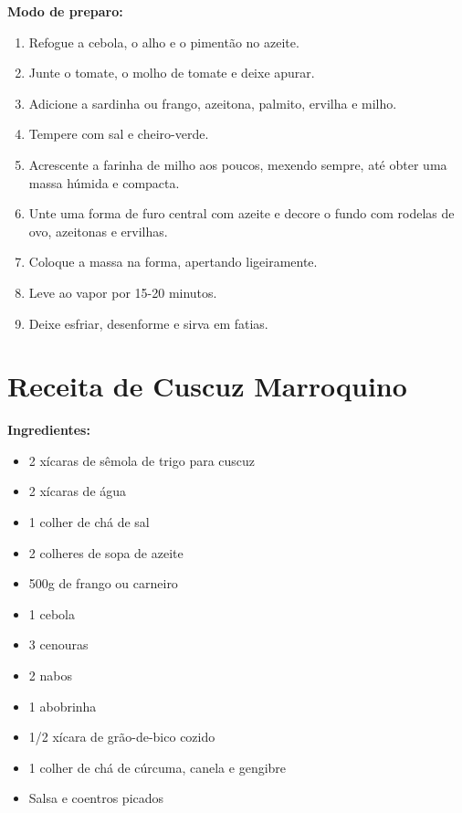 \documentclass[12pt,a4paper,openright]{book}
\begin{document}
\textbf{Modo de preparo:}
\begin{enumerate}
    \item Refogue a cebola, o alho e o pimentão no azeite.
    \item Junte o tomate, o molho de tomate e deixe apurar.
    \item Adicione a sardinha ou frango, azeitona, palmito, ervilha e milho.
    \item Tempere com sal e cheiro-verde.
    \item Acrescente a farinha de milho aos poucos, mexendo sempre, até obter uma massa húmida e compacta.
    \item Unte uma forma de furo central com azeite e decore o fundo com rodelas de ovo, azeitonas e ervilhas.
    \item Coloque a massa na forma, apertando ligeiramente.
    \item Leve ao vapor por 15-20 minutos.
    \item Deixe esfriar, desenforme e sirva em fatias.
\end{enumerate}

\section{Receita de Cuscuz Marroquino}

\textbf{Ingredientes:}
\begin{itemize}
    \item 2 xícaras de sêmola de trigo para cuscuz
    \item 2 xícaras de água
    \item 1 colher de chá de sal
    \item 2 colheres de sopa de azeite
    \item 500g de frango ou carneiro
    \item 1 cebola
    \item 3 cenouras
    \item 2 nabos
    \item 1 abobrinha
    \item 1/2 xícara de grão-de-bico cozido
    \item 1 colher de chá de cúrcuma, canela e gengibre
    \item Salsa e coentros picados
\end{itemize}
\end{document}
